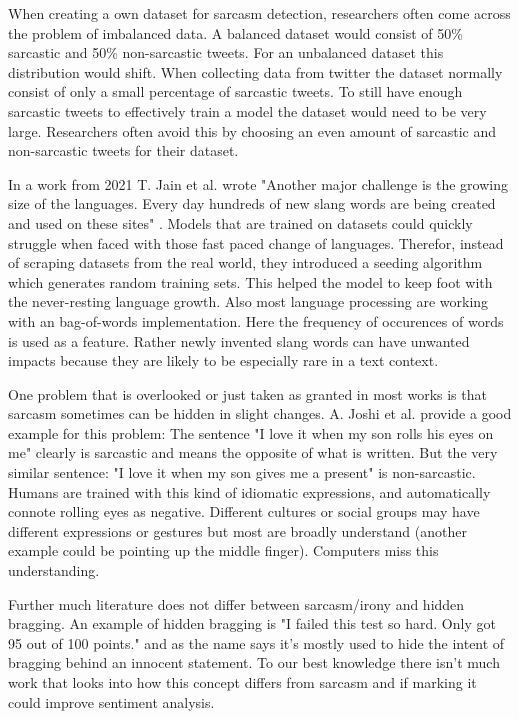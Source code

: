 \documentclass[sigconf,  review=false, nonacm=true]{acmart}
\begin{document}
When creating a own dataset for sarcasm detection, researchers often come across the problem of imbalanced data. A balanced dataset would consist of 50\% sarcastic and 50\% non-sarcastic tweets. For an unbalanced dataset this distribution would shift. When collecting data from twitter the dataset normally consist of only a small percentage of sarcastic tweets. To still have enough sarcastic tweets to effectively train a model the dataset would need to be very large. Researchers often avoid this by choosing an even amount of sarcastic and non-sarcastic tweets for their dataset.


In a work from 2021 T. Jain et al. wrote "Another major challenge is the growing size of the languages. Every day hundreds of new slang words are being created and used on these sites" \cite{Sarcasm_detection_of_tweets}. Models that are trained on datasets could quickly struggle when faced with those fast paced change of languages. Therefor, instead of scraping datasets from the real world, they introduced a seeding algorithm which generates random training sets. This helped the model to keep foot with the never-resting language growth.
Also most language processing are working with an bag-of-words implementation. Here the frequency of occurences of words is used as a feature. Rather newly invented slang words can have unwanted impacts because they are likely to be especially rare in a text context.

One problem that is overlooked or just taken as granted in most works is that sarcasm sometimes can be hidden in slight changes. A. Joshi et al. \cite{Automatic_Sarcasm_Detection} provide a good example for this problem: The sentence "I love it when my son rolls his eyes on me" clearly is sarcastic and means the opposite of what is written. But the very similar sentence: "I love it when my son gives me a present" is non-sarcastic. Humans are trained with this kind of idiomatic expressions, and automatically connote rolling eyes as negative. Different cultures or social groups may have different expressions or gestures but most are broadly understand (another example could be pointing up the middle finger). Computers miss this understanding.

Further much literature does not differ between sarcasm/irony and hidden bragging. An example of hidden bragging is "I failed this test so hard. Only got 95 out of 100 points." and as the name says it's mostly used to hide the intent of bragging behind an innocent statement. To our best knowledge there isn't much work that looks into how this concept differs from sarcasm and if marking it could improve sentiment analysis.
\end{document}
